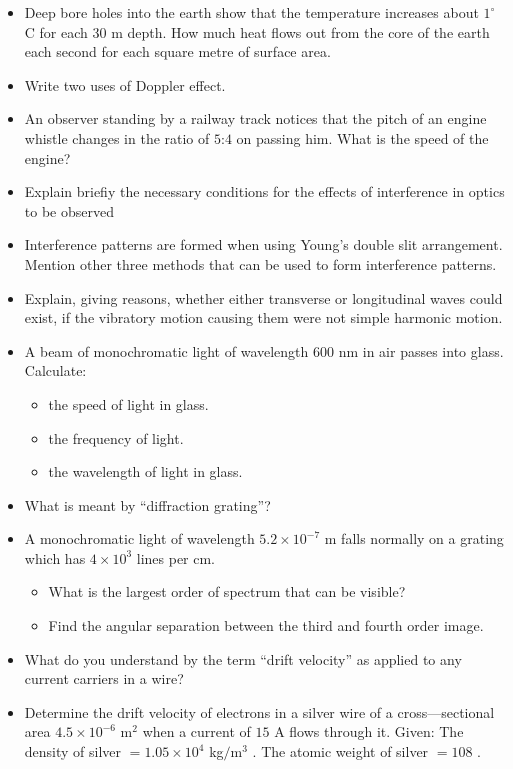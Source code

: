 \documentclass{article}
\begin{document}
\begin{itemize}
\item Deep bore holes into the earth show that the temperature increases about $ 1^{\circ}$C for each $ 30$ m depth. How much heat flows out from the core of the earth each second for each square metre of surface area.
\item Write two uses of Doppler effect.
\item An observer standing by a railway track notices that the pitch of an engine whistle changes in the ratio of $ 5$:$ 4$ on passing him. What is the speed of the engine?
\item Explain briefiy the necessary conditions for the effects of interference in optics to be observed
\item Interference patterns are formed when using Young’s double slit arrangement. Mention other three methods that can be used to form interference patterns.
\item Explain, giving reasons, whether either transverse or longitudinal waves could exist, if the vibratory motion causing them were not simple harmonic motion.
\item A beam of monochromatic light of wavelength $ 600$ nm in air passes into glass. Calculate:
 \begin{itemize}
\item the speed of light in glass.
\item the frequency of light.
\item the wavelength of light in glass.
\end{itemize}
\item What is meant by “diffraction grating”?
\item A monochromatic light of wavelength $ 5.2 \times 10^{-7}$ m falls normally on a grating which has $ 4 \times 10^{3}$ lines per cm.
 \begin{itemize}
\item What is the largest order of spectrum that can be visible?
\item Find the angular separation between the third and fourth order image.
\end{itemize}
\item What do you understand by the term “drift velocity” as applied to any current carriers in a wire?
\item Determine the drift velocity of electrons in a silver wire of a cross—sectional area $ 4.5 \times 10^{-6}$ m$ ^{2}$ when a current of $ 15$ A flows through it. Given: The density of silver $ =1.05 \times 10^{4}$ kg$/$m$ ^{3}$ . The atomic weight of silver $ =108$ .

\end{itemize}
\end{document}
